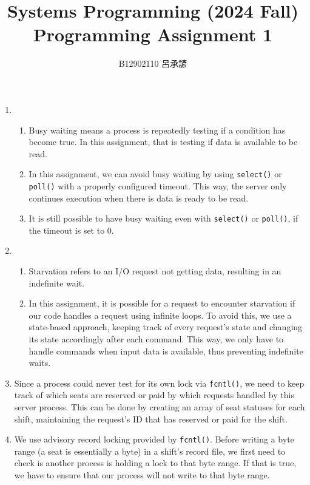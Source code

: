 \documentclass[12pt, a4paper]{article}
\title{
  \vspace{-1cm}
  Systems Programming (2024 Fall)\\
  Programming Assignment 1
}
\author{\Large B12902110 呂承諺}
\date{}
\begin{document}
  \maketitle
  \begin{enumerate}
    \item
    \begin{enumerate}
      \item Busy waiting means a process is repeatedly testing if a condition
      has become true. In this assignment, that is testing if data is available
      to be read.

      \item In this assignment, we can avoid busy waiting by using
      \verb|select()| or \verb|poll()| with a properly configured timeout.
      This way, the server only continues execution when there is data is ready
      to be read.

      \item It is still possible to have busy waiting even with \verb|select()|
      or \verb|poll()|, if the timeout is set to 0.
    \end{enumerate}

    \item
    \begin{enumerate}
      \item Starvation refers to an I/O request not getting data, resulting in
      an indefinite wait.
      \item In this assignment, it is possible for a request to encounter
      starvation if our code handles a request using infinite loops.
      To avoid this, we use a state-based approach, keeping track of every
      request's state and changing its state accordingly after each command.
      This way, we only have to handle commands when input data is available,
      thus preventing indefinite waits.
    \end{enumerate}

    \item Since a process could never test for its own lock via \verb|fcntl()|,
    we need to keep track of which seats are reserved or paid by which requests
    handled by this server process. This can be done by creating an array of
    seat statuses for each shift, maintaining the request's ID that has reserved
    or paid for the shift.

    \item We use advisory record locking provided by \verb|fcntl()|.
    Before writing a byte range (a seat is essentially a byte) in a shift's record
    file, we first need to check is another process is holding a lock to that
    byte range. If that is true, we have to ensure that our process will not write to
    that byte range.

  \end{enumerate}
\end{document}
